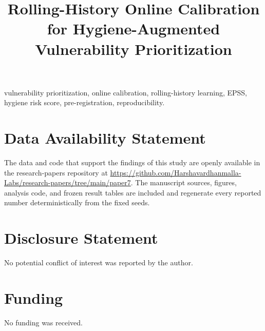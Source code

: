 \documentclass[journal]{IEEEtran}
\title{Rolling-History Online Calibration for Hygiene-Augmented
Vulnerability Prioritization}
\author{%
  \IEEEauthorblockN{Harshavardhan Malla}
  \IEEEauthorblockA{Independent Researcher\\
  Email: harshavardhanmalla75@gmail.com}%
}
\begin{document}
\maketitle

\begin{abstract}

\end{abstract}

\begin{IEEEkeywords}
vulnerability prioritization, online calibration, rolling-history learning,
EPSS, hygiene risk score, pre-registration, reproducibility.
\end{IEEEkeywords}













\section*{Data Availability Statement}
The data and code that support the findings of this study are openly available in the research-papers repository at \url{https://github.com/Harshavardhanmalla-Labs/research-papers/tree/main/paper7}. The manuscript sources, figures, analysis code, and frozen result tables are included and regenerate every reported number deterministically from the fixed seeds.

\section*{Disclosure Statement}
No potential conflict of interest was reported by the author.

\section*{Funding}
No funding was received.
\end{document}
